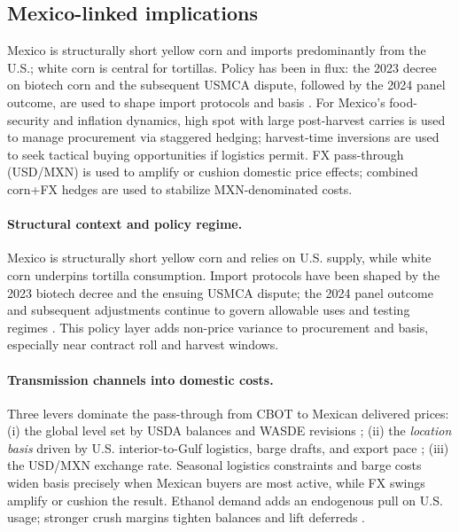 \documentclass[11pt,a4paper]{article} %
\begin{document}
\subsection{Mexico-linked implications}
Mexico is structurally short yellow corn and imports predominantly from the U.S.; white corn is central for tortillas. Policy has been in flux: the 2023 decree on biotech corn and the subsequent USMCA dispute, followed by the 2024 panel outcome, are used to shape import protocols and basis \citep{fas_mexico_decree_2023,ustr_usmca_biotech_2023,ustr_usmca_biotech_win_2024,reuters_mexico_gm_ban_2025,fas_mexico_grain_annual_2025}. For Mexico’s food-security and inflation dynamics, high spot with large post-harvest carries is used to manage procurement via staggered hedging; harvest-time inversions are used to seek tactical buying opportunities if logistics permit. FX pass-through (USD/MXN) is used to amplify or cushion domestic price effects; combined corn+FX hedges are used to stabilize MXN-denominated costs.

\paragraph{Structural context and policy regime.}
Mexico is structurally short yellow corn and relies on U.S. supply, while white corn underpins tortilla consumption. Import protocols have been shaped by the 2023 biotech decree and the ensuing USMCA dispute; the 2024 panel outcome and subsequent adjustments continue to govern allowable uses and testing regimes \citep{fas_mexico_decree_2023,ustr_usmca_biotech_2023,ustr_usmca_biotech_win_2024,reuters_mexico_gm_ban_2025,fas_mexico_grain_annual_2025}. This policy layer adds non-price variance to procurement and basis, especially near contract roll and harvest windows.

\paragraph{Transmission channels into domestic costs.}
Three levers dominate the pass-through from CBOT to Mexican delivered prices:
(i) the global level set by USDA balances and WASDE revisions \citep{usda_wasde,ers_feedgrains_outlook};
(ii) the \emph{location basis} driven by U.S. interior-to-Gulf logistics, barge drafts, and export pace \citep{ams_gtr_2023};
(iii) the USD/MXN exchange rate. Seasonal logistics constraints and barge costs widen basis precisely when Mexican buyers are most active, while FX swings amplify or cushion the result. Ethanol demand adds an endogenous pull on U.S. usage; stronger crush margins tighten balances and lift deferreds \citep{ers_ethanol_40}.
\end{document}
